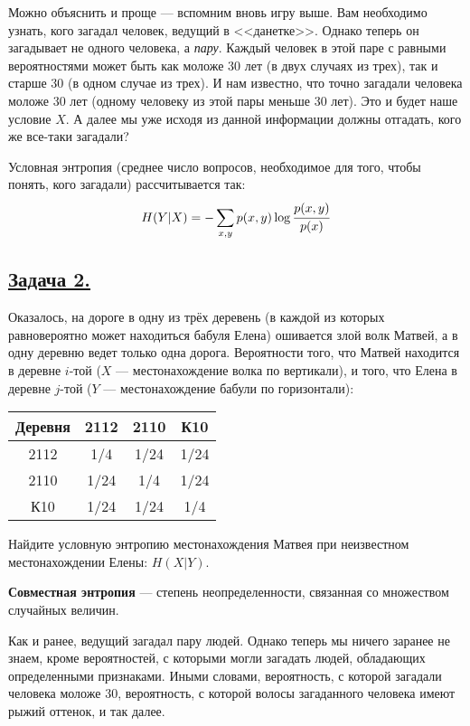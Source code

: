 Можно объяснить и проще --- вспомним вновь игру выше. Вам необходимо узнать, кого загадал человек, ведущий в <<данетке>>. Однако теперь он загадывает не одного человека, а \textit{пару}. Каждый человек в этой паре с равными вероятностями может быть как моложе 30 лет (в двух случаях из трех), так и старше 30 (в одном случае из трех). И нам известно, что точно загадали человека моложе 30 лет (одному человеку из этой пары меньше 30 лет). Это и будет наше условие $X$. А далее мы уже исходя из данной информации должны отгадать, кого же все-таки загадали?

Условная энтропия (среднее число вопросов, необходимое для того, чтобы понять, кого загадали) рассчитывается так:
\[H(Y|X)=-\sum\limits_{x, y} p(x, y)\log \cfrac{p(x, y)}{p(x)} \]

\subsection*{\hyperref[sec:sol_problem2]{Задача 2.}}\label{sec:problem2} Оказалось, на дороге в одну из трёх деревень (в каждой из которых равновероятно может находиться бабуля Елена) ошивается злой волк Матвей, а в одну деревню ведет только одна дорога. Вероятности того, что Матвей находится в деревне $i$-той ($X$ --- местонахождение волка по вертикали), и того, что Елена в деревне $j$-той ($Y$ --- местонахождение бабули по горизонтали):
\begin{center}
    \begin{tabular}{c||c|c|c}
        Деревня & 2112 & 2110 & К10 \\
        \hline
        \hline
        2112 & 1/4 & 1/24 & 1/24 \\
        \hline
        2110 & 1/24 & 1/4 & 1/24 \\
        \hline
        К10 & 1/24 & 1/24 & 1/4 \\
    \end{tabular}
\end{center}

Найдите условную энтропию местонахождения Матвея при неизвестном местонахождении Елены: $H(X|Y)$. 
\\

\begin{siderules}
    \textbf{Совместная энтропия} --- степень неопределенности, связанная со множеством случайных величин.
\end{siderules}

Как и ранее, ведущий загадал пару людей. Однако теперь мы ничего заранее не знаем, кроме вероятностей, с которыми могли загадать людей, обладающих определенными признаками. Иными словами, вероятность, с которой загадали человека моложе 30, вероятность, с которой волосы загаданного человека имеют рыжий оттенок, и так далее.

